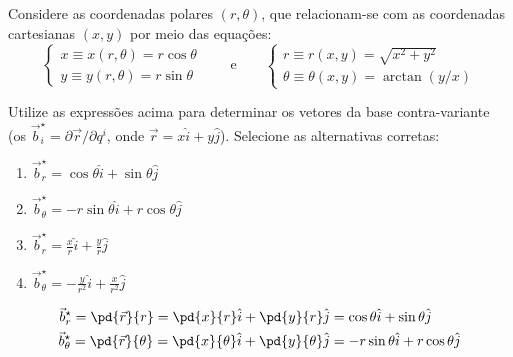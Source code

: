 \begin{question}
    Considere as coordenadas polares $(r,\theta)$, que relacionam-se com as coordenadas cartesianas $(x,y)$ por meio das equações:
    \begin{equation}
      \left\{
      \begin{matrix}
        x \equiv x(r, \theta) = r \cos\theta \\
        y \equiv y(r, \theta) = r \sin\theta
      \end{matrix}
      \right.
      \qquad\text{e}\qquad
      \left\{
      \begin{matrix}
        r \equiv r(x,y) = \sqrt{x^2 + y^2} \\
        \theta \equiv \theta(x,y) = \arctan\left(y/x\right)
      \end{matrix}
      \right.
    \end{equation}

    Utilize as expressões acima para determinar os vetores da base contra-variante (os $\vec b_i^{\star} = \partial\vec r/\partial q^i$, onde $\vec r = x\hat i + y\hat j$).
    Selecione as alternativas corretas:
    \begin{enumerate}
      \item $\vec b_r^{\star} = \cos\theta\hat i + \sin\theta\hat j$ \rightanswer
      \item $\vec b_\theta^{\star} = -r\sin\theta\hat i + r\cos\theta\hat j$ \rightanswer
      \item $\vec b_r^{\star} = \frac{x}{r}\hat i + \frac{y}{r}\hat j$
      \item $\vec b_\theta^{\star} = -\frac{y}{r^2}\hat i + \frac{x}{r^2}\hat j$
    \end{enumerate}

    \begin{solution}
      \begin{align*}
        \vec b_r^{\star} = \pd{\vec r}{r} = \pd{x}{r}\hat i + \pd{y}{r}\hat j &= \cos\theta \hat i + \sin\theta \hat j \\
        \vec b_\theta^{\star} = \pd{\vec r}{\theta} = \pd{x}{\theta}\hat i + \pd{y}{\theta}\hat j &= -r \sin\theta \hat i + r \cos\theta \hat j \\ 
      \end{align*}
    \end{solution}
\end{question}
